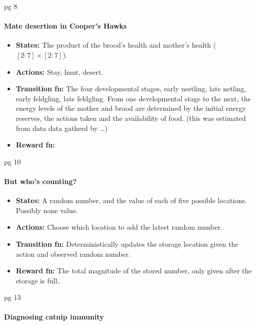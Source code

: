 \cite{Putterman2015} pg 8

\hypertarget{mate-desertion-in-coopers-hawks}{%
\paragraph{Mate desertion in Cooper's
Hawks}\label{mate-desertion-in-coopers-hawks}}

\begin{itemize}
\tightlist
\item
  \textbf{States:} The product of the brood's health and mother's health
  (\([2:7] \times [2:7]\)).
\item
  \textbf{Actions:} Stay, hunt, desert.
\item
  \textbf{Transition fn:} The four developmental stages, early nestling,
  late netling, early feldgling, late feldgling. From one developmental
  stage to the next, the energy levels of the mother and brood are
  determined by the initial energy reserves, the actions taken and the
  availability of food. (this was estimated from data data gatherd by
  \ldots{})
\item
  \textbf{Reward fn:}
\end{itemize}

\cite{Putterman2015} pg 10

\hypertarget{but-whos-counting}{%
\paragraph{But who's counting?}\label{but-whos-counting}}

\begin{itemize}
\tightlist
\item
  \textbf{States:} A random number, and the value of each of five
  possible locations. Possibly none value.
\item
  \textbf{Actions:} Choose which location to add the latest random
  number.
\item
  \textbf{Transition fn:} Deterministically updates the storage location
  given the action and observed random number.
\item
  \textbf{Reward fn:} The total magnitude of the stored number, only
  given after the storage is full..
\end{itemize}

\cite{Putterman2015} pg 13

\hypertarget{diagnosing-catnip-immunity}{%
\paragraph{Diagnosing catnip
immunity}\label{diagnosing-catnip-immunity}}

